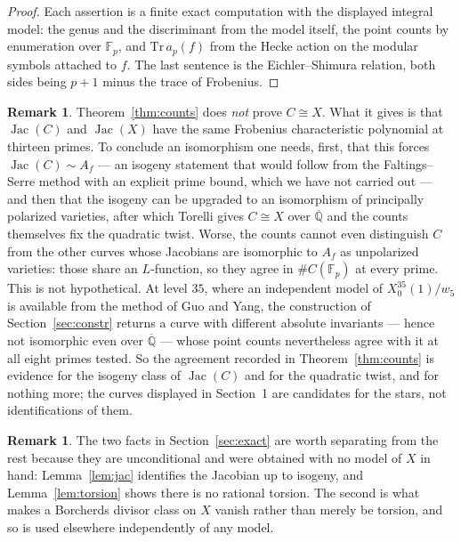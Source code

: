 \documentclass[11pt,reqno]{amsart}
\theoremstyle{plain}
\theoremstyle{definition}
\newtheorem{remark}[theorem]{Remark}
\DeclareMathOperator{\Jac}{Jac}
\newcommand{\Q}{\mathbb{Q}}
\newcommand{\F}{\mathbb{F}}
\begin{document}
\begin{proof}
Each assertion is a finite exact computation with the displayed integral model: the genus and the
discriminant from the model itself, the point counts by enumeration over $\F_p$, and
$\mathrm{Tr}\,a_p(f)$ from the Hecke action on the modular symbols attached to $f$. The last
sentence is the Eichler--Shimura relation, both sides being $p+1$ minus the trace of Frobenius.
\end{proof}

\begin{remark}\label{rem:gap}
Theorem~\ref{thm:counts} does \emph{not} prove $C \cong X$. What it gives is that $\Jac(C)$ and
$\Jac(X)$ have the same Frobenius characteristic polynomial at thirteen primes. To conclude an
isomorphism one needs, first, that this forces $\Jac(C) \sim A_f$ --- an isogeny statement that
would follow from the Faltings--Serre method with an explicit prime bound, which we have not
carried out --- and then that the isogeny can be upgraded to an isomorphism of principally
polarized varieties, after which Torelli gives $C \cong X$ over $\overline{\Q}$ and the counts
themselves fix the quadratic twist. Worse, the counts cannot even distinguish $C$ from the other curves whose Jacobians are isomorphic
to $A_f$ as unpolarized varieties: those share an $L$-function, so they agree in $\#C(\F_p)$ at
every prime. This is not hypothetical. At level $35$, where an independent model of
$X_0^{35}(1)/w_5$ is available from the method of Guo and Yang, the construction of
Section~\ref{sec:constr} returns a curve with different absolute invariants --- hence not
isomorphic even over $\overline{\Q}$ --- whose point counts nevertheless agree with it at all
eight primes tested. So the agreement recorded in Theorem~\ref{thm:counts} is evidence for the
isogeny class of $\Jac(C)$ and for the quadratic twist, and for nothing more; the curves displayed
in Section~1 are candidates for the stars, not identifications of them.
\end{remark}

\begin{remark}
The two facts in Section~\ref{sec:exact} are worth separating from the rest because they are
unconditional and were obtained with no model of $X$ in hand: Lemma~\ref{lem:jac} identifies the
Jacobian up to isogeny, and Lemma~\ref{lem:torsion} shows there is no rational torsion. The second
is what makes a Borcherds divisor class on $X$ vanish rather than merely be torsion, and so is used
elsewhere independently of any model.
\end{remark}
\end{document}
